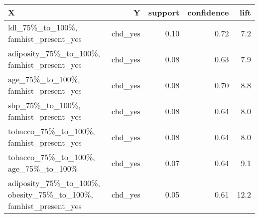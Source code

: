 \begin{tabular}{p{7.5cm}rrrr}
\toprule
                                                               X &        Y &  support &  confidence &  lift \\
\midrule
                            ldl\_75\%\_to\_100\%, famhist\_present\_yes &  chd\_yes &     0.10 &        0.72 &   7.2 \\
                      adiposity\_75\%\_to\_100\%, famhist\_present\_yes &  chd\_yes &     0.08 &        0.63 &   7.9 \\
                            age\_75\%\_to\_100\%, famhist\_present\_yes &  chd\_yes &     0.08 &        0.70 &   8.8 \\
                            sbp\_75\%\_to\_100\%, famhist\_present\_yes &  chd\_yes &     0.08 &        0.64 &   8.0 \\
                        tobacco\_75\%\_to\_100\%, famhist\_present\_yes &  chd\_yes &     0.08 &        0.64 &   8.0 \\
                            tobacco\_75\%\_to\_100\%, age\_75\%\_to\_100\% &  chd\_yes &     0.07 &        0.64 &   9.1 \\
 adiposity\_75\%\_to\_100\%, obesity\_75\%\_to\_100\%, famhist\_present\_yes &  chd\_yes &     0.05 &        0.61 &  12.2 \\
\bottomrule
\end{tabular}
